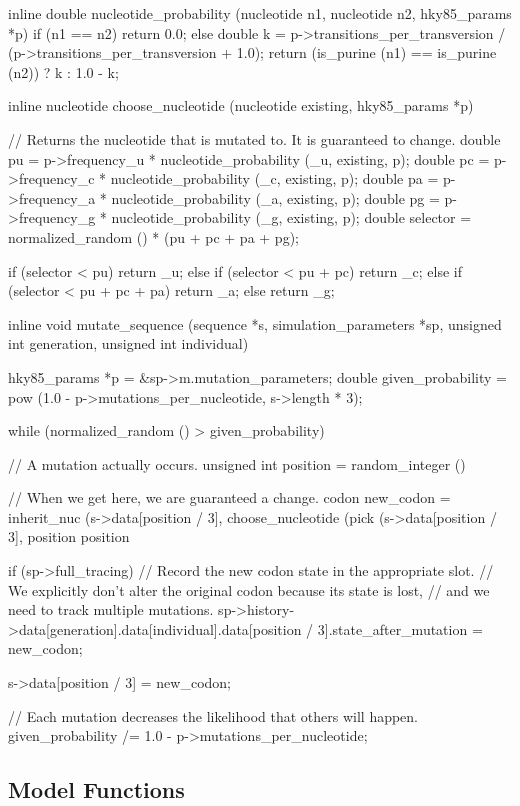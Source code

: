 \documentclass{article}
\begin{document}
\begin{ccode}
inline double nucleotide_probability (nucleotide n1, nucleotide n2, hky85_params *p) {
  if (n1 == n2)
    return 0.0;
  else {
    double k = p->transitions_per_transversion /
	       (p->transitions_per_transversion + 1.0);
    return (is_purine (n1) == is_purine (n2)) ? k : 1.0 - k;
  }
}

inline nucleotide choose_nucleotide (nucleotide existing, hky85_params *p) {
  // Returns the nucleotide that is mutated to. It is guaranteed to change.
  double pu        = p->frequency_u * nucleotide_probability (_u, existing, p);
  double pc        = p->frequency_c * nucleotide_probability (_c, existing, p);
  double pa        = p->frequency_a * nucleotide_probability (_a, existing, p);
  double pg        = p->frequency_g * nucleotide_probability (_g, existing, p);
  double selector  = normalized_random () * (pu + pc + pa + pg);

  if (selector < pu)        	 	return _u;
  else if (selector < pu + pc)		return _c;
  else if (selector < pu + pc + pa)	return _a;
  else					return _g;
}

inline void mutate_sequence (sequence *s, simulation_parameters *sp,
			     unsigned int generation, unsigned int individual) {
  hky85_params *p = &sp->m.mutation_parameters;
  double given_probability = pow (1.0 - p->mutations_per_nucleotide, s->length * 3);

  while (normalized_random () > given_probability) {
    // A mutation actually occurs.
    unsigned int position = random_integer () %

    // When we get here, we are guaranteed a change.
    codon new_codon =
      inherit_nuc (s->data[position / 3],
		   choose_nucleotide (pick (s->data[position / 3], position %
		   position %

    if (sp->full_tracing)
      // Record the new codon state in the appropriate slot.
      // We explicitly don't alter the original codon because its state is lost,
      // and we need to track multiple mutations.
      sp->history->data[generation].data[individual].data[position / 3].state_after_mutation = new_codon;

    s->data[position / 3] = new_codon;
    
    // Each mutation decreases the likelihood that others will happen.
    given_probability /= 1.0 - p->mutations_per_nucleotide;
  }
}
\end{ccode}

    \subsection{Model Functions}
\end{document}
